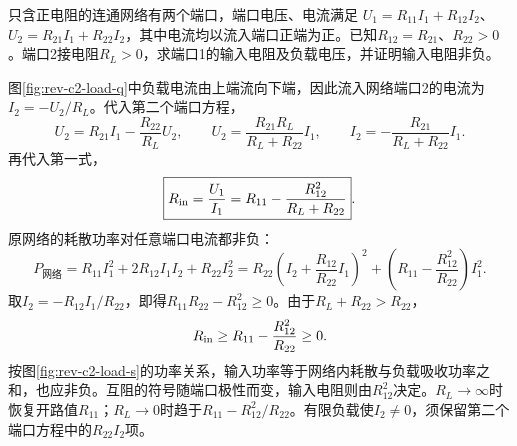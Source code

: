 \begin{exercise}[互易网络接入有限负载]\label{ex:rev-c2-load}
只含正电阻的连通网络有两个端口，端口电压、电流满足
$U_1=R_{11}I_1+R_{12}I_2$、$U_2=R_{21}I_1+R_{22}I_2$，其中电流均以流入端口正端为正。已知$R_{12}=R_{21}$、$R_{22}>0$。端口2接电阻$R_L>0$，求端口1的输入电阻及负载电压，并证明输入电阻非负。
\end{exercise}
\begin{solution}
图\ref{fig:rev-c2-load-q}中负载电流由上端流向下端，因此流入网络端口2的电流为$I_2=-U_2/R_L$。代入第二个端口方程，
\[
 U_2=R_{21}I_1-\frac{R_{22}}{R_L}U_2,
 \qquad U_2=\frac{R_{21}R_L}{R_L+R_{22}}I_1,
 \qquad I_2=-\frac{R_{21}}{R_L+R_{22}}I_1.
\]
再代入第一式，
\[
 \boxed{R_{\rm in}=\frac{U_1}{I_1}=R_{11}-\frac{R_{12}^2}{R_L+R_{22}}}.
\]
原网络的耗散功率对任意端口电流都非负：
\[
 P_{\text{网络}}=R_{11}I_1^2+2R_{12}I_1I_2+R_{22}I_2^2
 =R_{22}\left(I_2+\frac{R_{12}}{R_{22}}I_1\right)^2
 +\left(R_{11}-\frac{R_{12}^2}{R_{22}}\right)I_1^2.
\]
取$I_2=-R_{12}I_1/R_{22}$，即得$R_{11}R_{22}-R_{12}^2\ge0$。由于$R_L+R_{22}>R_{22}$，
\[
 R_{\rm in}\ge R_{11}-\frac{R_{12}^2}{R_{22}}\ge0.
\]
按图\ref{fig:rev-c2-load-s}的功率关系，输入功率等于网络内耗散与负载吸收功率之和，也应非负。互阻的符号随端口极性而变，输入电阻则由$R_{12}^2$决定。$R_L\to\infty$时恢复开路值$R_{11}$；$R_L\to0$时趋于$R_{11}-R_{12}^2/R_{22}$。有限负载使$I_2\ne0$，须保留第二个端口方程中的$R_{22}I_2$项。
\end{solution}

